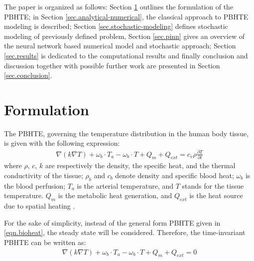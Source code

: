 \documentclass[conference]{IEEEtran}
\begin{document}
The paper is organized as follows: Section \ref{sec.formulation} outlines the formulation of the PBHTE; in Section \ref{sec.analytical-numerical}, the classical approach to PBHTE modeling is described; Section \ref{sec.stochastic-modeling} defines stochastic modeling of previously defined problem, Section \ref{sec.pinn} gives an overview of the neural network based numerical model and stochastic approach; Section \ref{sec.results} is dedicated to the computational results and finally conclusion and discussion together with possible further work are presented in Section \ref{sec.conclusion}.

\section{Formulation}
\label{sec.formulation}
The PBHTE, governing the temperature distribution in the human body tissue, is given with the following expression:
\begin{equation}
\begin{aligned}
\nabla(k \nabla T) + \omega_b \cdot T_a - \omega_b \cdot T + Q_m + Q_{ext} = c_v \rho \frac{\partial T}{\partial t}
\end{aligned}
\label{eqn.bioheat}
\end{equation}
where $\rho$, $c$, $k$ are respectively the density, the specific heat, and the thermal conductivity of the tissue; $\rho_b$ and $c_b$ denote density and specific blood heat; $\omega_b$ is the blood perfusion; $T_a$ is the arterial temperature, and $T$ stands for the tissue temperature. $Q_m$ is the metabolic heat generation, and $Q_{ext}$ is the heat source due to spatial heating \cite{deng_bioheat_2002}.

For the sake of simplicity, instead of the general form PBHTE given in \eqref{eqn.bioheat}, the steady state will be considered. Therefore, the time-invariant PBHTE can be written as:
\begin{equation}
\begin{aligned}
\nabla(k \nabla T) + \omega_b \cdot T_a - \omega_b \cdot T + Q_m + Q_{ext} = 0
\end{aligned}
\label{eqn.bioheat-time-inv}
\end{equation}
\end{document}

